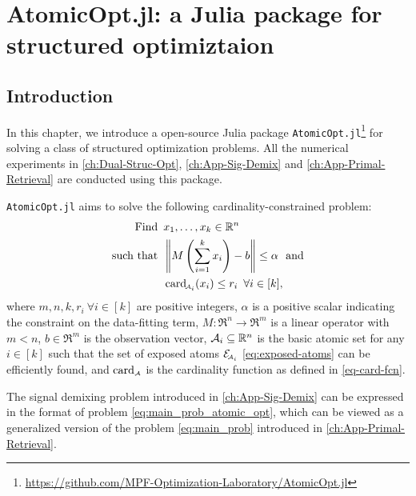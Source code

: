 \chapter{AtomicOpt.jl: a Julia package for structured optimiztaion}
\label{ch:App-AtomicOpt}

\section{Introduction} \label{sec:5-1}
In this chapter, we introduce a open-source Julia package \texttt{AtomicOpt.jl}\footnote{\url{https://github.com/MPF-Optimization-Laboratory/AtomicOpt.jl}} for solving a class of structured optimization problems. All the numerical experiments in \autoref{ch:Dual-Struc-Opt}, \autoref{ch:App-Sig-Demix} and \autoref{ch:App-Primal-Retrieval} are conducted using this package. 

\texttt{AtomicOpt.jl} aims to solve the following cardinality-constrained problem:
\begin{equation} \label{eq:main_prob_atomic_opt} 
\begin{split}
  \mathop{\hbox{\rm Find}}\enspace & x_1, \dots, x_k \in \mathbb{R}^n \\
  \enspace\mathop{\hbox{\rm such that}}\enspace  & \left\|M\left(\sum_{i=1}^k x_i\right) - b \right\| \leq \alpha \enspace\mathop{\hbox{\rm and}}\enspace \\
        & \operatorname{card}_{\!\scriptscriptstyle\mathcal{A}_i}(x_i) \leq r_i \enspace \forall i \in [k],
\end{split}
\end{equation}
where $m, n, k, r_i ~\forall i\in[k]$ are positive integers, $\alpha$ is a positive scalar indicating the constraint on the data-fitting term, $M: \Re^n \to \Re^m$ is a linear operator with $m < n$, $b \in \Re^m$ is the observation vector, $\mathcal{A}_i \subseteq \mathbb{R}^n$ is the basic atomic set for any $i\in[k]$ such that the set of exposed atoms $\mathcal{E}_{\!\scriptscriptstyle\mathcal{A}_i}$ \eqref{eq:exposed-atoms} can be efficiently found, and $\operatorname{card}_{\scriptscriptstyle\mathcal{A}}$ is the cardinality function as defined in \eqref{eq-card-fcn}. 

The signal demixing problem introduced in \autoref{ch:App-Sig-Demix} can be expressed in the format of problem \eqref{eq:main_prob_atomic_opt}, which can be viewed as a generalized version of the problem \eqref{eq:main_prob} introduced in \autoref{ch:App-Primal-Retrieval}. 

